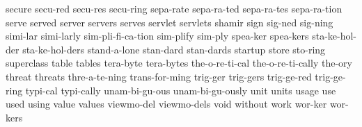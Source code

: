 {    secure
    secu-red
    secu-res
    secu-ring
    sepa-rate
    sepa-ra-ted
    sepa-ra-tes
    sepa-ra-tion
    serve
    served
    server
    servers
    serves
    servlet
    servlets
    shamir
    sign
    sig-ned
    sig-ning
    simi-lar
    simi-larly
    sim-pli-fi-ca-tion
    sim-plify
    sim-ply
    spea-ker
    spea-kers
    sta-ke-hol-der
    sta-ke-hol-ders
    stand-a-lone
    stan-dard
    stan-dards
    startup
    store
    sto-ring
    superclass
    table
    tables
    tera-byte
    tera-bytes
    the-o-re-ti-cal
    the-o-re-ti-cally
    the-ory
    threat
    threats
    thre-a-te-ning
    trans-for-ming
    trig-ger
    trig-gers
    trig-ge-red
    trig-ge-ring
    typi-cal
    typi-cally
    unam-bi-gu-ous
    unam-bi-gu-ously
    unit
    units
    usage
    use
    used
    using
    value
    values
    viewmo-del
    viewmo-dels
    void
    without
    work
    wor-ker
    wor-kers
}
